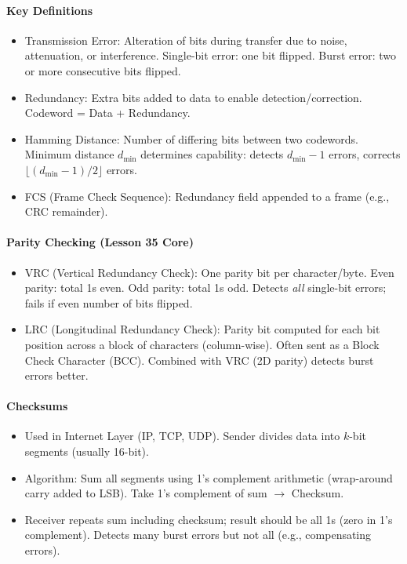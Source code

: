 \documentclass[11pt]{article}
\newcommand{\cle}[1]{{\popxbold\color{popdark}#1}}
\begin{document}
\begin{bilan}

\paragraph{Key Definitions}
\begin{itemize}
    \item \cle{Transmission Error}: Alteration of bits during transfer due to noise, attenuation, or interference. \cle{Single-bit error}: one bit flipped. \cle{Burst error}: two or more consecutive bits flipped.
    \item \cle{Redundancy}: Extra bits added to data to enable detection/correction. \cle{Codeword} = Data + Redundancy.
    \item \cle{Hamming Distance}: Number of differing bits between two codewords. Minimum distance $d_{\min}$ determines capability: detects $d_{\min}-1$ errors, corrects $\lfloor(d_{\min}-1)/2\rfloor$ errors.
    \item \cle{FCS (Frame Check Sequence)}: Redundancy field appended to a frame (e.g., CRC remainder).
\end{itemize}

\paragraph{Parity Checking (Lesson 35 Core)}
\begin{itemize}
    \item \cle{VRC (Vertical Redundancy Check)}: One parity bit per character/byte. \cle{Even parity}: total 1s even. \cle{Odd parity}: total 1s odd. Detects \emph{all} single-bit errors; fails if even number of bits flipped.
    \item \cle{LRC (Longitudinal Redundancy Check)}: Parity bit computed for each bit position across a block of characters (column-wise). Often sent as a Block Check Character (BCC). Combined with VRC (2D parity) detects burst errors better.
\end{itemize}

\paragraph{Checksums}
\begin{itemize}
    \item Used in Internet Layer (IP, TCP, UDP). Sender divides data into $k$-bit segments (usually 16-bit).
    \item \cle{Algorithm}: Sum all segments using \cle{1's complement arithmetic} (wrap-around carry added to LSB). Take 1's complement of sum $\rightarrow$ \cle{Checksum}.
    \item Receiver repeats sum including checksum; result should be all 1s (zero in 1's complement). Detects many burst errors but not all (e.g., compensating errors).
\end{itemize}


\end{bilan}
\end{document}
